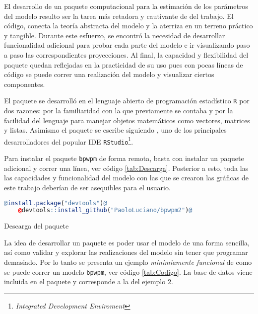\documentclass[../../Main/Main.tex]{subfiles}
\begin{document}
El desarrollo de un paquete computacional para la estimación de los parámetros del modelo resulto ser la tarea más retadora y cautivante de del trabajo. El código, conecta la teoría abstracta del modelo y la aterriza en un terreno práctico y tangible. Durante este esfuerzo, se encontró la necesidad de desarrollar funcionalidad adicional para probar cada parte del modelo e ir visualizando paso a paso las correspondientes proyecciones. Al final, la capacidad y flexibilidad del paquete quedan reflejadas en la practicidad de su uso pues con pocas líneas de código se puede correr una realización del modelo y visualizar ciertos componentes.

El paquete se desarrolló en el lenguaje abierto de programación estadístico \verb|R| por dos razones: por la familiaridad con la que previamente se contaba y por la facilidad del lenguaje para manejar objetos matemáticos como vectores, matrices y listas.  Asimismo el paquete se escribe siguiendo \citet{wickham2015rpck}, uno de los principales desarrolladores del popular IDE \verb|RStudio|\footnote{\emph{Integrated Development Enviroment}}. 

Para instalar el paquete \verb|bpwpm| de forma remota, basta con instalar un paquete adicional y correr una línea, ver código \ref{tab:Descarga}. Posterior a esto, toda las las capacidades y funcionalidad del modelo con las que se crearon las gráficas de este trabajo deberían de ser asequibles para el usuario.

\begin{table}[h]
\makebox[\linewidth]{\rule{\textwidth}{0.4pt}}
\begin{lstlisting}[language = R, style = base]
	@install.package("devtools")@
	@devtools::install_github("PaoloLuciano/bpwpm2")@
\end{lstlisting}
\makebox[\linewidth]{\rule{\textwidth}{0.4pt}}
\caption{Descarga del paquete}
\label{tab:Descarga}
\end{table}

La idea de desarrollar un paquete es poder usar el modelo de una forma sencilla, así como validar y explorar las realizaciones del modelo sin tener que programar demasiado. Por lo tanto se presenta un ejemplo \textit{mínimiamente funcional} de como se puede correr un modelo \verb|bpwpm|, ver código \ref{tab:Codigo}. La base de datos viene incluida en el paquete y corresponde a la del ejemplo 2.
\end{document}
